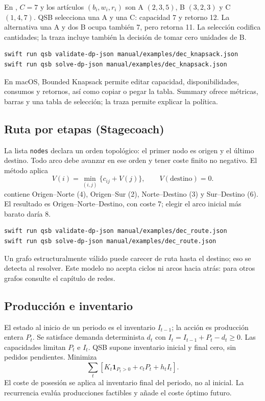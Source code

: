 En , $C=7$ y los artículos
$(b_i,w_i,r_i)$ son A $(2,3,5)$, B $(3,2,3)$ y C $(1,4,7)$.
QSB selecciona una A y una C: capacidad 7 y retorno 12. La alternativa una A
y dos B ocupa también 7, pero retorna 11. La selección codifica cantidades;
la traza incluye también la decisión de tomar cero unidades de B.
\begin{lstlisting}
swift run qsb validate-dp-json manual/examples/dec_knapsack.json
swift run qsb solve-dp-json manual/examples/dec_knapsack.json
\end{lstlisting}
En macOS, Bounded Knapsack permite editar capacidad, disponibilidades,
consumos y retornos, así como copiar o pegar la tabla. Summary ofrece métricas,
barras y una tabla de selección; la traza permite explicar la política.

\subsection{Ruta por etapas (Stagecoach)}
La lista \texttt{nodes} declara un orden topológico: el primer nodo es origen
y el último destino. Todo arco debe avanzar en ese orden y tener coste finito
no negativo. El método aplica
\[
 V(i)=\min_{(i,j)}\{c_{ij}+V(j)\},\qquad V(\text{destino})=0.
\]
 contiene Origen--Norte (4), Origen--Sur (2),
Norte--Destino (3) y Sur--Destino (6). El resultado es
Origen--Norte--Destino, con coste 7; elegir el arco inicial más barato daría 8.
\begin{lstlisting}
swift run qsb validate-dp-json manual/examples/dec_route.json
swift run qsb solve-dp-json manual/examples/dec_route.json
\end{lstlisting}
Un grafo estructuralmente válido puede carecer de ruta hasta el destino; eso
se detecta al resolver. Este modelo no acepta ciclos ni arcos hacia atrás:
para otros grafos consulte el capítulo de redes.

\subsection{Producción e inventario}
El estado al inicio de un periodo es el inventario $I_{t-1}$; la acción es
producción entera $P_t$. Se satisface demanda determinista $d_t$ con
$I_t=I_{t-1}+P_t-d_t\geq0$. Las capacidades limitan $P_t$ e $I_t$.
QSB supone inventario inicial y final cero, sin pedidos pendientes. Minimiza
\[
 \sum_t\left[K_t\mathbf{1}_{P_t>0}+c_tP_t+h_tI_t\right].
\]
El coste de posesión se aplica al inventario final del periodo, no al inicial.
La recurrencia evalúa producciones factibles y añade el coste óptimo futuro.

